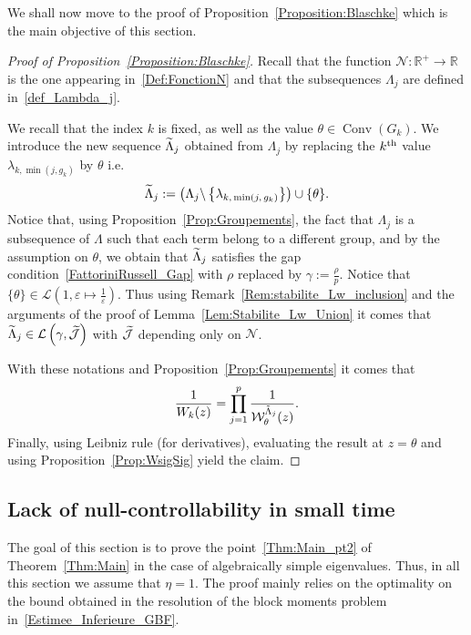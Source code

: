 \documentclass[AHL,Unicode,longabstracts]{cedram}
\DeclareMathOperator{\Conv}{Conv}
\newcommand{\n}{g}
\newcommand{\LL}{\mathcal{L}}
\newcommand{\R}{\mathbb{R}}
\let\oldtilde\tilde
\renewcommand*{\tilde}[1]{\mathchoice{\widetilde{#1}}{\widetilde{#1}}{\oldtilde{#1}}{\oldtilde{#1}}}\let\oldexists\exists
\renewcommand*{\exists}{\mathrel{\oldexists}}
\begin{document}
We shall now move to the proof of Proposition~\ref{Proposition:Blaschke} which is the main objective of this section.
\begin{proof}[Proof of Proposition~\ref{Proposition:Blaschke}]
Recall that the function $\mathcal{N} : \R^+ \to \R$ is the one appearing in~\eqref{Def:FonctionN} and that the subsequences $\Lambda_j$ are defined in~\eqref{def_Lambda_j}.

We recall that the index $k$ is fixed, as well as the value $\theta\in \Conv(G_k)$. We introduce the new sequence $\tilde{\Lambda}_j$ obtained from $\Lambda_j$ by replacing the $k^{\rm th}$ value $\lambda_{k,\min(j,\n_k)}$ by $\theta$ i.e.
\[
\tilde{\Lambda}_j := \left(\Lambda_j \backslash \left\{ \lambda_{k,\,\min(j,\,\n_k)} \right\} \right) \cup \{ \theta \}.
\]
Notice that, using Proposition~\ref{Prop:Groupements}, the fact that $\Lambda_j$ is a subsequence of $\Lambda$ such that each term belong to a different group, and by the assumption on $\theta$, we obtain that $\tilde{\Lambda}_j$ satisfies the gap condition~\eqref{FattoriniRussell_Gap} with $\rho$ replaced by $\gamma:=\frac{\rho}{p}$. Notice that $\{ \theta \} \in \LL \left(1, \varepsilon \mapsto \frac{1}{\varepsilon} \right)$. Thus using Remark~\ref{Rem:stabilite_Lw_inclusion} and the arguments of the proof of Lemma~\ref{Lem:Stabilite_Lw_Union} it comes that $\tilde{\Lambda}_j \in \mathcal{L}\left(\gamma,\tilde{\mathcal{J}}\right)$ with $\tilde{\mathcal{J}}$ depending only on $\mathcal{N}$.


With these notations and Proposition~\ref{Prop:Groupements} it comes that
\[
\frac{1}{W_k(z)} = \prod_{j=1}^p \frac{1}{\mathcal{W}^{\tilde{\Lambda}_j}_{\theta} (z)}.
\]
Finally, using Leibniz rule (for derivatives), evaluating the result at $z=\theta$ and using Proposition~\ref{Prop:WsigSig} yield the claim.
\end{proof}



\subsection{Lack of null-controllability in small time}\label{Sec:NonControlabilite}

The goal of this section is to prove the point~\eqref{Thm:Main_pt2} of Theorem~\ref{Thm:Main} in the case of algebraically simple eigenvalues. Thus, in all this section we assume that $\eta=1$. The proof mainly relies on the optimality on the bound obtained in the resolution of the block moments problem in~\eqref{Estimee_Inferieure_GBF}.
\end{document}
